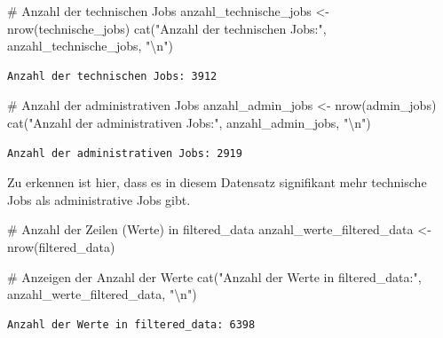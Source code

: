 \documentclass[
  letterpaper,
  DIV=11,
  numbers=noendperiod]{scrartcl}
\newenvironment{Shaded}{\begin{snugshade}}{\end{snugshade}}
\newcommand{\CommentTok}[1]{\textcolor[rgb]{0.37,0.37,0.37}{#1}}
\newcommand{\FunctionTok}[1]{\textcolor[rgb]{0.28,0.35,0.67}{#1}}
\newcommand{\NormalTok}[1]{\textcolor[rgb]{0.00,0.23,0.31}{#1}}
\newcommand{\OtherTok}[1]{\textcolor[rgb]{0.00,0.23,0.31}{#1}}
\newcommand{\SpecialCharTok}[1]{\textcolor[rgb]{0.37,0.37,0.37}{#1}}
\newcommand{\StringTok}[1]{\textcolor[rgb]{0.13,0.47,0.30}{#1}}
\begin{document}
\begin{Shaded}
\begin{Highlighting}[]
\CommentTok{\# Anzahl der technischen Jobs}
\NormalTok{anzahl\_technische\_jobs }\OtherTok{\textless{}{-}} \FunctionTok{nrow}\NormalTok{(technische\_jobs)}
\FunctionTok{cat}\NormalTok{(}\StringTok{"Anzahl der technischen Jobs:"}\NormalTok{, anzahl\_technische\_jobs, }\StringTok{"}\SpecialCharTok{\textbackslash{}n}\StringTok{"}\NormalTok{)}
\end{Highlighting}
\end{Shaded}

\begin{verbatim}
Anzahl der technischen Jobs: 3912 
\end{verbatim}

\begin{Shaded}
\begin{Highlighting}[]
\CommentTok{\# Anzahl der administrativen Jobs}
\NormalTok{anzahl\_admin\_jobs }\OtherTok{\textless{}{-}} \FunctionTok{nrow}\NormalTok{(admin\_jobs)}
\FunctionTok{cat}\NormalTok{(}\StringTok{"Anzahl der administrativen Jobs:"}\NormalTok{, anzahl\_admin\_jobs, }\StringTok{"}\SpecialCharTok{\textbackslash{}n}\StringTok{"}\NormalTok{)}
\end{Highlighting}
\end{Shaded}

\begin{verbatim}
Anzahl der administrativen Jobs: 2919 
\end{verbatim}

Zu erkennen ist hier, dass es in diesem Datensatz signifikant mehr
technische Jobs als administrative Jobs gibt.

\begin{Shaded}
\begin{Highlighting}[]
\CommentTok{\# Anzahl der Zeilen (Werte) in filtered\_data}
\NormalTok{anzahl\_werte\_filtered\_data }\OtherTok{\textless{}{-}} \FunctionTok{nrow}\NormalTok{(filtered\_data)}

\CommentTok{\# Anzeigen der Anzahl der Werte}
\FunctionTok{cat}\NormalTok{(}\StringTok{"Anzahl der Werte in filtered\_data:"}\NormalTok{, anzahl\_werte\_filtered\_data, }\StringTok{"}\SpecialCharTok{\textbackslash{}n}\StringTok{"}\NormalTok{)}
\end{Highlighting}
\end{Shaded}

\begin{verbatim}
Anzahl der Werte in filtered_data: 6398 
\end{verbatim}
\end{document}

